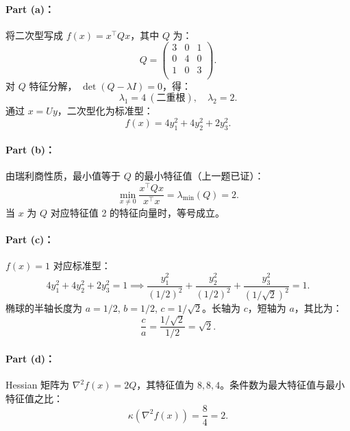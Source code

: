 \paragraph{Part (a)：}  
将二次型写成 \( f(x) = x^\top Qx \)，其中 \( Q \) 为：
\[
Q = \begin{pmatrix}
3 & 0 & 1 \\
0 & 4 & 0 \\
1 & 0 & 3 \\
\end{pmatrix}.
\]
对 \( Q \) 特征分解， \( \det(Q - \lambda I) = 0 \)，得：
\[
\lambda_1 = 4 \ (\text{二重根}), \quad \lambda_2 = 2.
\]
通过 \( x = Uy \)，二次型化为标准型：
\[
\boxed{f(x) = 4y_1^2 + 4y_2^2 + 2y_3^2}.
\]

\paragraph{Part (b)：}  
由瑞利商性质，最小值等于 \( Q \) 的最小特征值（上一题已证）：
\[
\boxed{\min_{x \neq 0} \frac{x^\top Qx}{x^\top x} = \lambda_{\min}(Q) = 2}.
\]
当 \( x \) 为 \( Q \) 对应特征值 2 的特征向量时，等号成立。

\paragraph{Part (c)：}  
\( f(x) = 1 \) 对应标准型：
\[
4y_1^2 + 4y_2^2 + 2y_3^2 = 1 \implies \frac{y_1^2}{(1/2)^2} + \frac{y_2^2}{(1/2)^2} + \frac{y_3^2}{(1/\sqrt{2})^2} = 1.
\]
椭球的半轴长度为 \( a = 1/2 \), \( b = 1/2 \), \( c = 1/\sqrt{2} \)。长轴为 \( c \)，短轴为 \( a \)，其比为：
\[
\boxed{\frac{c}{a} = \frac{1/\sqrt{2}}{1/2} = \sqrt{2}}.
\]

\paragraph{Part (d)：}  
Hessian 矩阵为 \( \nabla^2 f(x) = 2Q \)，其特征值为 \( 8, 8, 4 \)。条件数为最大特征值与最小特征值之比：
\[
\boxed{\kappa(\nabla^2 f(x)) = \frac{8}{4} = 2}.
\]

